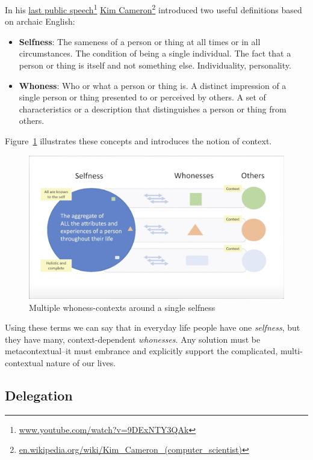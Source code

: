 \documentclass[11pt, oneside]{article}   	%
\newcommand{\hyperfootnote}[1][]{\def\ArgI{{#1}}\hyperfootnoteRelay}
\newcommand\hyperfootnoteRelay[2][]{\href{#1#2}{\ArgI}\footnote{\href{#1#2}{#2}}}
\begin{document}
In his \hyperfootnote[last public speech][https://]{www.youtube.com/watch?v=9DExNTY3QAk}  
\hyperfootnote[Kim Cameron][https://]{en.wikipedia.org/wiki/Kim\_Cameron\_(computer\_scientist)} introduced two useful definitions based on archaic English:

\begin{itemize}
\item \textbf{Selfness}: The sameness of a person or thing at all times or in all circumstances. The condition of being a single individual. The fact that a person or thing is itself and not something else. Individuality, personality. 
\item \textbf{Whoness}: Who or what a person or thing is. A distinct impression of a single person or thing presented to or perceived by others. A set of characteristics or a description that distinguishes a person or thing from others. 
\end{itemize}

Figure~\ref{fig:multiple-contexts} illustrates these concepts and introduces the notion of context.

\begin{figure}[htbp]
\includegraphics[width=\textwidth]{./images/selfness-and-whoness-larger.png}
\caption{Multiple whoness-contexts around a single selfness}
\label{fig:multiple-contexts}
\end{figure}

Using these terms we can say that in everyday life people have one \emph{selfness}, but they have many, context-dependent \emph{whonesses}. Any solution must be metacontextual--it must embrance and explicitly support the complicated, multi-contextual nature of our lives.

\subsection{Delegation}
\end{document}
